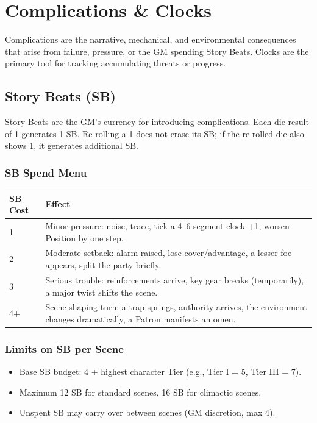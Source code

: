 
\section{Complications \& Clocks}

Complications are the narrative, mechanical, and environmental consequences that arise from failure, pressure, or the GM spending Story Beats. Clocks are the primary tool for tracking accumulating threats or progress.

\subsection{Story Beats (SB)}

Story Beats are the GM's currency for introducing complications. Each die result of 1 generates 1 SB. Re-rolling a 1 does not erase its SB; if the re-rolled die also shows 1, it generates additional SB.

\subsubsection{SB Spend Menu}

\begin{tabular}{@{}ll@{}}
\toprule
\textbf{SB Cost} & \textbf{Effect} \\
\midrule
1 & Minor pressure: noise, trace, tick a 4–6 segment clock +1, worsen Position by one step. \\
2 & Moderate setback: alarm raised, lose cover/advantage, a lesser foe appears, split the party briefly. \\
3 & Serious trouble: reinforcements arrive, key gear breaks (temporarily), a major twist shifts the scene. \\
4+ & Scene-shaping turn: a trap springs, authority arrives, the environment changes dramatically, a Patron manifests an omen. \\
\bottomrule
\end{tabular}

\subsubsection{Limits on SB per Scene}
\begin{itemize}
  \item Base SB budget: 4 + highest character Tier (e.g., Tier I = 5, Tier III = 7).
  \item Maximum 12 SB for standard scenes, 16 SB for climactic scenes.
  \item Unspent SB may carry over between scenes (GM discretion, max 4).
\end{itemize}

